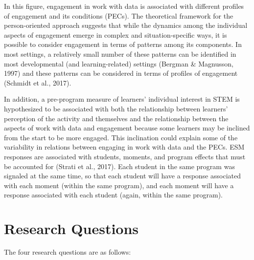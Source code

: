 \documentclass[]{msu-thesis}
\theoremstyle{definition}
\theoremstyle{definition}
\theoremstyle{definition}
\theoremstyle{remark}
\begin{document}
In this figure, engagement in work with data is associated with
different profiles of engagement and its conditions (PECs). The
theoretical framework for the person-oriented approach suggests that
while the dynamics among the individual aspects of engagement emerge in
complex and situation-specific ways, it is possible to consider
engagement in terms of patterns among its components. In most settings,
a relatively small number of these patterns can be identified in most
developmental (and learning-related) settings (Bergman \& Magnusson,
1997) and these patterns can be considered in terms of profiles of
engagement (Schmidt et al., 2017).

In addition, a pre-program measure of learners' individual interest in
STEM is hypothesized to be associated with both the relationship between
learners' perception of the activity and themselves and the relationship
between the aspects of work with data and engagement because some
learners may be inclined from the start to be more engaged. This
inclination could explain some of the variability in relations between
engaging in work with data and the PECs. ESM responses are associated
with students, moments, and program effects that must be accounted for
(Strati et al., 2017). Each student in the same program was signaled at
the same time, so that each student will have a response associated with
each moment (within the same program), and each moment will have a
response associated with each student (again, within the same program).

\section{Research Questions}\label{research-questions}

The four research questions are as follows:
\end{document}

